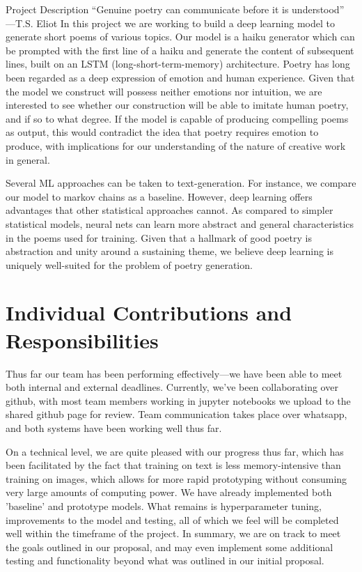 \documentclass{article} %
\begin{document}
Project Description
“Genuine poetry can communicate before it is understood” —T.S. Eliot
In this project we are working to build a deep learning model to generate short poems of various topics.
Our model is a haiku generator which can be prompted with the first line of a haiku and generate the content of subsequent lines, built on an LSTM (long-short-term-memory) architecture.
Poetry has long been regarded as a deep expression of emotion and human experience. Given that the model we construct will possess neither emotions nor intuition, we are interested to see whether our construction will be able to imitate human poetry, and if so to what degree. If the model is capable of producing compelling poems as output, this would contradict the idea that poetry requires emotion to produce, with implications for our understanding of the nature of creative work in general.


Several ML approaches can be taken to text-generation.
For instance, we compare our model to markov chains as a baseline.
However, deep learning offers advantages that other statistical approaches cannot.
As compared to simpler statistical models, neural nets can learn more abstract and general characteristics in the poems used for training.
Given that a hallmark of good poetry is abstraction and unity around a sustaining theme,
we believe deep learning is uniquely well-suited for the problem of poetry generation.

\section{Individual Contributions and Responsibilities}

Thus far our team has been performing effectively—we have been able to meet both internal and external deadlines. Currently, we've been collaborating over github, with most team members working in jupyter notebooks we upload to the shared github page for review. Team communication takes place over whatsapp, and both systems have been working well thus far.

On a technical level, we are quite pleased with our progress thus far, which has been facilitated by the fact that training on text is less memory-intensive than training on images, which allows for more rapid prototyping without consuming very large amounts of computing power. We have already implemented both 'baseline' and prototype models. What remains is hyperparameter tuning, improvements to the model and testing, all of which we feel will be completed well within the timeframe of the project. In summary, we are on track to meet the goals outlined in our proposal, and may even implement some additional testing and functionality beyond what was outlined in our initial proposal.
\end{document}
